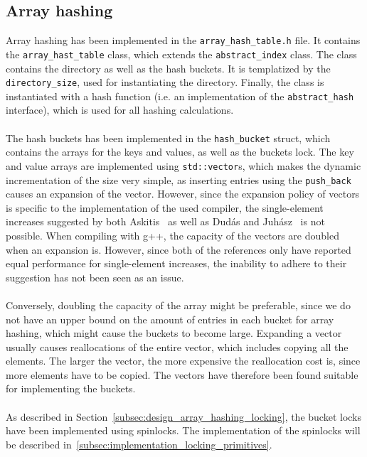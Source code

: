 \documentclass[11pt]{report} %
\begin{document}
\subsection{Array hashing}
\label{subsec:implementation_array_hashing}
Array hashing has been implemented in the \verb|array_hash_table.h| file. It contains the \verb|array_hast_table| class, which extends the \verb|abstract_index| class. The class contains the directory as well as the hash buckets. It is templatized by the \verb|directory_size|, used for instantiating the directory. Finally, the class is instantiated with a hash function (i.e. an implementation of the \verb|abstract_hash| interface), which is used for all hashing calculations.\\
\\
The hash buckets has been implemented in the \verb|hash_bucket| struct, which contains the arrays for the keys and values, as well as the buckets lock. The key and value arrays are implemented using \verb|std::vector|s, which makes the dynamic incrementation of the size very simple, as inserting entries using the \verb|push_back| causes an expansion of the vector. However, since the expansion policy of vectors is specific to the implementation of the used compiler, the single-element increases suggested by both Askitis~\cite{NA09} as well as Dudás and Juhász~\cite{ADSJ13} is not possible. When compiling with g++, the capacity of the vectors are doubled when an expansion is. However, since both of the references only have reported equal performance for single-element increases, the inability to adhere to their suggestion has not been seen as an issue. \\
\\
Conversely, doubling the capacity of the array might be preferable, since we do not have an upper bound on the amount of entries in each bucket for array hashing, which might cause the buckets to become large. Expanding a vector usually causes reallocations of the entire vector, which includes copying all the elements. The larger the vector, the more expensive the reallocation cost is, since more elements have to be copied. The vectors have therefore been found suitable for implementing the buckets.\\
\\
As described in Section~\ref{subsec:design_array_hashing_locking}, the bucket locks have been implemented using spinlocks. The implementation of the spinlocks will be described in~\ref{subsec:implementation_locking_primitives}.\\
\end{document}
